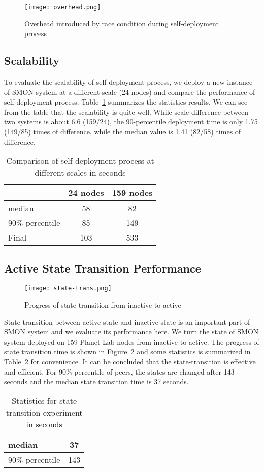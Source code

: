 \begin{figure}
\centering
\texttt{[image: overhead.png]}
\caption{Overhead introduced by race condition during
self-deployment process}
\label{fig:overhead}
\end{figure}

\subsection{Scalability}
To evaluate the scalability of self-deployment process, we deploy
a new instance of SMON system at a different scale (24 nodes) and
compare the performance of self-deployment process.
Table~\ref{tbl:scalability} summarizes the statistics results.
We can see from the table that the scalability is quite well.
While scale difference between two systems is about 6.6 (159/24), the
90-percentile deployment time is only 1.75 (149/85) times of
difference, while the median value is 1.41 (82/58) times of
difference.

\begin{table}
\centering
\begin{tabular}{|l|c|c|}
\hline
  & 24 nodes & 159 nodes\\
\hline
median & 58 & 82 \\
\hline
90\% percentile & 85 & 149 \\
\hline
Final & 103 & 533 \\
\hline
\end{tabular}
\caption{Comparison of self-deployment process at different scales in seconds}
\label{tbl:scalability}
\end{table}

\subsection{Active State Transition Performance}

\begin{figure}
\centering
\texttt{[image: state-trans.png]}
\caption{Progress of state transition from inactive to active}
\label{fig:state-transition}
\end{figure}

State transition between active state and inactive state
is an important part of SMON system and we evaluate its
performance here. We turn the state of SMON system deployed on 159
Planet-Lab nodes from inactive to active.
The progress of state transition time is shown in
Figure~\ref{fig:state-transition} and some statistics is
summarized in Table~\ref{tbl:state-transition} for convenience. It can be
concluded that the
state-transition is effective and efficient. For 90\% percentile
of peers, the states are changed after 143 seconds and the
median state transition time is 37 seconds.


\begin{table}
\centering
\begin{tabular}{|l|c|}
\hline
median & 37 \\
\hline
90\% percentile & 143 \\
\hline
\end{tabular}
\caption{Statistics for state transition experiment in seconds}
\label{tbl:state-transition}
\end{table}


